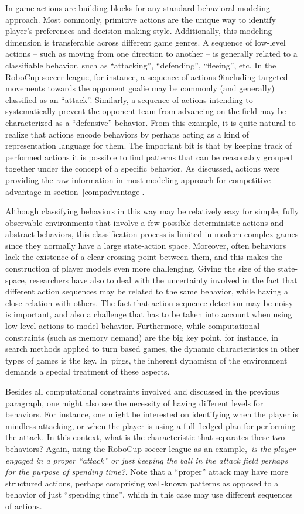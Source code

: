 In-game actions are building blocks for any standard behavioral modeling approach. Most commonly, primitive actions are the unique way to identify player's preferences and decision-making style. Additionally, this modeling dimension is transferable across different game genres. A sequence of low-level actions -- such as moving from one direction to another -- is generally related to a classifiable behavior, such as ``attacking'', ``defending'', ``fleeing'', etc. In the RoboCup soccer league, for instance, a sequence of actions 9including targeted movements towards the opponent goalie may be commonly (and generally) classified as an ``attack''. Similarly, a sequence of actions intending to systematically prevent the opponent team from advancing on the field may be characterized as a ``defensive'' behavior. From this example, it is quite natural to realize that actions encode behaviors by perhaps acting as a kind of representation language for them. The important bit is that by keeping track of performed actions it is possible to find patterns that can be reasonably grouped together under the concept of a specific behavior. As discussed, actions were providing the raw information in most modeling approach for competitive advantage in section~\ref{compadvantage}.

Although classifying behaviors in this way may be relatively easy for simple, fully observable environments that involve a few possible deterministic actions and abstract behaviors, this classification process is limited in modern complex games since they normally have a large state-action space. Moreover, often behaviors lack the existence of a clear crossing point between them, and this makes the construction of player models even more challenging. Giving the size of the state-space, researchers have also to deal with the uncertainty involved in the fact that different action sequences may be related to the same behavior, while having a close relation with others. The fact that action sequence detection may be noisy is important, and also a challenge that has to be taken into account when using low-level actions to model behavior.  Furthermore, while computational constraints (such as memory demand) are the big key point, for instance, in search methods applied to turn based games, the dynamic characteristics in other types of games is the key. In~\gls{pirg}s, the inherent dynamism of the environment demands a special treatment of these aspects.

Besides all computational constraints involved and discussed in the previous paragraph, one might also see  the necessity of having different levels for behaviors. For instance, one might be interested on identifying when the player is mindless attacking, or when the player is using a full-fledged plan for performing the attack. In this context, what is the characteristic that separates these two behaviors? Again, using the RoboCup soccer league as an example,~\textit{is the player engaged in a proper ``attack'' or just keeping the ball in the attack field perhaps for the purpose of spending time?}. Note that a ``proper'' attack may have more structured actions, perhaps comprising well-known patterns as opposed to a behavior of just ``spending time'', which in this case may use different sequences of actions.

